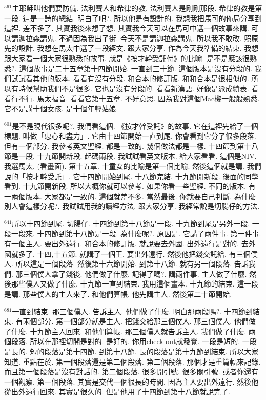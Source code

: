 \documentclass{book}
\begin{document}
$^{561}$主耶穌叫他們要防備.
法利賽人和希律的教.
法利賽人是剛剛那段.
希律的教是第一段.
這是一詩的總結.
明白了吧?.
所以他是有設計的.
我想我把馬可的佈局分享到這裡.
差不多了.
其實我後來想了想.
其實我今天可以在馬可中選一個故事來講.
可以講迦拉森講鬼.
不過因為我出了街.
今天不是講迦拉森講鬼.
所以我不敢改.
照原先的設計.
我想在馬太中選了一段經文.
跟大家分享.
作為今天我準備的結束.
我想跟大家看一個大家很熟悉的故事.
就是《按才幹受託付》的比喻.
是不是應該很熟悉?.
這個故事是二十五章第十四節開始.
一直到三十節.
這個版本是沒有分段的.
我們試試看其他的版本.
看看有沒有分段.
和合本的修訂版.
和和合本是很相似的.
所以有時候幫助我們不是很多.
它也是沒有分段的.
看看新漢語.
好像是派成績表.
看看行不行.
馬太福音.
看看它第十五章.
不好意思.
因為我對這個Mac機一般般熟悉.
它不是講十個女孩.
是十個年輕姑娘.

$^{601}$是不是現代很多呢?.
我們看這個.
《按才幹受託》的故事.
它在這裡先給了一個標題.
叫做「忠心和盡力」.
它由十四節開始一直到尾.
你會看到它分了很多段落.
但有一個部分.
我參考英文聖經.
都是一致的.
幾個做法都是一樣.
十四節到第十八節是一段.
十九節開新段.
起碼兩段.
我試試看英文版本.
給大家看看.
這個是NIV.
我選馬太.
(看畫面).
第十五章.
十童女的比喻是第一個比喻.
然後這個就是講.
我們說的「按才幹受託」.
它十四節開始到尾.
十八節完結.
十九節開新段.
後面的同學看到.
十九節開新段.
所以大概你就可以參考.
如果你看一些聖經.
不同的版本.
有一兩個版本.
大家都是一致的.
這個就差不多.
當然最後.
你就要自己判斷.
為什麼別人會這樣分呢?.
我試試用我的讀經方法.
跟大家分享.
我經常說是切腸仔的方法.

$^{641}$所以十四節到尾.
切腸仔.
十四節到第十八節是一段.
十九節到尾是另外一段.
一段一段來.
十四節到第十八節是一段.
為什麼呢?.
原因是.
它講了兩件事.
第一件事.
有一個主人.
要出外遠行.
和合本的修訂版.
就說要去外國.
出外遠行是對的.
去外國就多了.
十四,十五節.
就講了一個王.
要出外遠行.
然後他把錢交託給.
有三個僕人.
所以這是一個段落.
然後第十六節開始.
到第十八節.
就有另一個段落.
告訴我們.
那三個僕人拿了錢後.
他們做了什麼.
記得了嗎?.
講兩件事.
主人做了什麼.
然後那些僕人又做了什麼.
十九節一直到結束.
我用這個畫本.
十九節的結束.
這一段是講.
那些僕人的主人來了.
和他們算帳.
他先講主人.
然後第二十節開始.

$^{681}$一直到結束.
那三個僕人.
告訴主人.
他們做了什麼.
明白那兩段嗎?.
十四節到結束.
有兩個部分.
第一個部分就是主人.
把錢交給那三個僕人.
那三個僕人.
他們做了什麼.
十九節主人回來.
和他們算帳.
那三個僕人就告訴主人.
我們做了什麼.
兩個段落.
所以在那裡切開是對的.
是好的.
你用check out就發覺.
一段是短的.
一段是長的.
短的段落是第十四節.
到第十八節.
長的段落是第十九節到結束.
所以大家知道.
重點在於.
第一個段落還是第二個段落.
第二個段落.
那個才是重篇幅來記錄.
而且第一個段落是沒有對話的.
第二個段落.
很多開引號.
很多關引號.
或者你還有一個觀察.
第一個段落.
其實是交代一個很長的時間.
因為主人要出外遠行.
然後他從出外遠行回來.
其實是很久的.
但是他用了十四節到第十八節就說完了.
\end{document}
